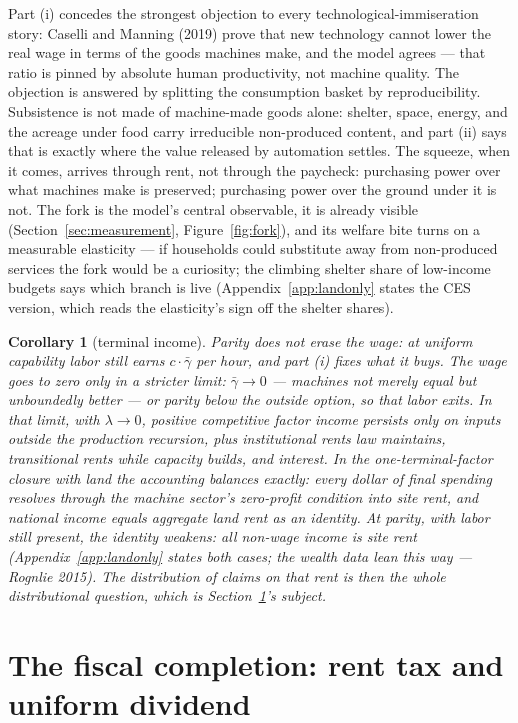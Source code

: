 \documentclass[12pt]{article}
\theoremstyle{plain}
\newtheorem*{corollary}{Corollary}
\begin{document}
Part (i) concedes the strongest objection to every technological-immiseration story: Caselli and Manning (2019) prove that new technology cannot lower the real wage in terms of the goods machines make, and the model agrees --- that ratio is pinned by absolute human productivity, not machine quality. The objection is answered by splitting the consumption basket by reproducibility. Subsistence is not made of machine-made goods alone: shelter, space, energy, and the acreage under food carry irreducible non-produced content, and part (ii) says that is exactly where the value released by automation settles. The squeeze, when it comes, arrives through rent, not through the paycheck: purchasing power over what machines make is preserved; purchasing power over the ground under it is not. The fork is the model's central observable, it is already visible (Section~\ref{sec:measurement}, Figure~\ref{fig:fork}), and its welfare bite turns on a measurable elasticity --- if households could substitute away from non-produced services the fork would be a curiosity; the climbing shelter share of low-income budgets says which branch is live (Appendix~\ref{app:landonly} states the CES version, which reads the elasticity's sign off the shelter shares).

\begin{corollary}[terminal income]
Parity does not erase the wage: at uniform capability labor still earns $c\cdot \bar{\gamma}$ per hour, and part (i) fixes what it buys. The wage goes to zero only in a stricter limit: $\bar{\gamma} \to 0$ --- machines not merely equal but unboundedly better --- or parity below the outside option, so that labor exits. In that limit, with $\lambda \to 0$, positive competitive factor income persists only on inputs outside the production recursion, plus institutional rents law maintains, transitional rents while capacity builds, and interest. In the one-terminal-factor closure with land the accounting balances exactly: every dollar of final spending resolves through the machine sector's zero-profit condition into site rent, and national income equals aggregate land rent as an identity. At parity, with labor still present, the identity weakens: all non-wage income is site rent (Appendix~\ref{app:landonly} states both cases; the wealth data lean this way --- Rognlie 2015). The distribution of claims on that rent is then the whole distributional question, which is Section~\ref{sec:fiscal}'s subject.
\end{corollary}

\section{The fiscal completion: rent tax and uniform dividend}\label{sec:fiscal}
\end{document}
